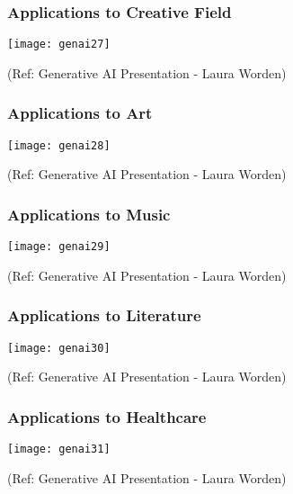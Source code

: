 \begin{frame}[fragile]\frametitle{Applications to Creative Field}

\begin{center}
\texttt{[image: genai27]}
\end{center}


{\tiny (Ref: Generative AI Presentation  - Laura Worden)}

\end{frame}

\begin{frame}[fragile]\frametitle{Applications to Art}

\begin{center}
\texttt{[image: genai28]}
\end{center}


{\tiny (Ref: Generative AI Presentation  - Laura Worden)}

\end{frame}

\begin{frame}[fragile]\frametitle{Applications to Music}

\begin{center}
\texttt{[image: genai29]}
\end{center}


{\tiny (Ref: Generative AI Presentation  - Laura Worden)}

\end{frame}

\begin{frame}[fragile]\frametitle{Applications to Literature}

\begin{center}
\texttt{[image: genai30]}
\end{center}


{\tiny (Ref: Generative AI Presentation  - Laura Worden)}

\end{frame}

\begin{frame}[fragile]\frametitle{Applications to Healthcare}

\begin{center}
\texttt{[image: genai31]}
\end{center}


{\tiny (Ref: Generative AI Presentation  - Laura Worden)}

\end{frame}

